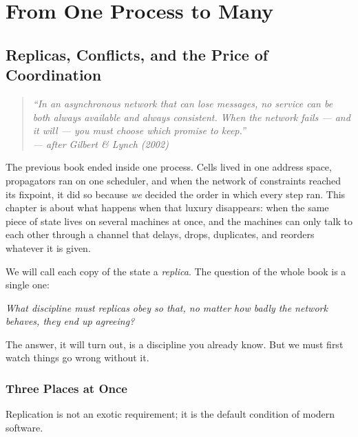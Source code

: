 \documentclass[12pt, a4paper, openright]{book}
\theoremstyle{thmstyle}
\theoremstyle{defstyle}
\begin{document}
\tableofcontents

\mainmatter
\part{From One Process to Many}

\chapter{Replicas, Conflicts, and the Price of Coordination}
\label{ch:intro}

\begin{quote}
  \itshape
  ``In an asynchronous network that can lose messages, no service can be
  both always available and always consistent. When the network fails ---
  and it will --- you must choose which promise to keep.''\\
  --- after Gilbert \& Lynch (2002)
\end{quote}

The previous book ended inside one process. Cells lived in one address
space, propagators ran on one scheduler, and when the network of
constraints reached its fixpoint, it did so because \emph{we} decided the
order in which every step ran. This chapter is about what happens when
that luxury disappears: when the same piece of state lives on several
machines at once, and the machines can only talk to each other through a
channel that delays, drops, duplicates, and reorders whatever it is
given.

We will call each copy of the state a \emph{replica}. The question of
the whole book is a single one:

\medskip
\noindent\emph{What discipline must replicas obey so that, no matter how
badly the network behaves, they end up agreeing?}
\medskip

The answer, it will turn out, is a discipline you already know. But we
must first watch things go wrong without it.

\section{Three Places at Once}

Replication is not an exotic requirement; it is the default condition of
modern software.
\end{document}
